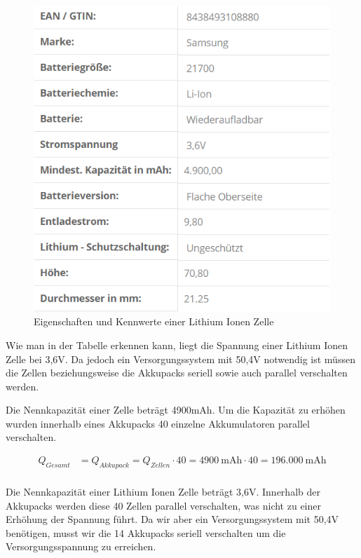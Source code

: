 \begin{figure}[H]
	\begin{center}
		\includegraphics[scale=1.0]{figures/Akku/LithiumIonenZellen.PNG}
		\caption{Eigenschaften und Kennwerte einer Lithium Ionen Zelle}
	\end{center}
\end{figure}

Wie man in der Tabelle erkennen kann, liegt die Spannung einer Lithium Ionen Zelle bei 3,6V. Da jedoch ein Versorgungssystem mit 50,4V notwendig ist müssen die Zellen beziehungsweise die Akkupacks seriell sowie auch parallel verschalten werden. 

Die Nennkapazität einer Zelle beträgt 4900mAh. Um die Kapazität zu erhöhen wurden innerhalb eines Akkupacks 40 einzelne Akkumulatoren parallel verschalten.

\begin{align*}
Q_{Gesamt} &= Q_{Akkupack}= Q_{Zellen} \cdot 40 = 4900~\mathrm{mAh} \cdot 40= 196.000~\mathrm{mAh}\\
\end{align*}

Die Nennkapazität einer Lithium Ionen Zelle beträgt 3,6V. Innerhalb der Akkupacks werden diese 40 Zellen parallel verschalten, was nicht zu einer Erhöhung der Spannung führt. Da wir aber ein Versorgungssystem mit 50,4V benötigen, musst wir die 14 Akkupacks seriell verschalten um die Versorgungsspannung zu erreichen.

